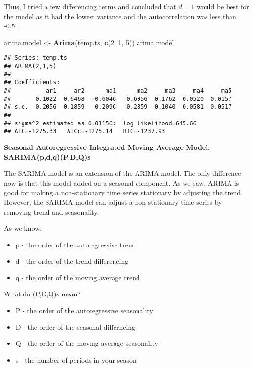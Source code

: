 \documentclass[
]{book}
\newenvironment{Shaded}{\begin{snugshade}}{\end{snugshade}}
\newcommand{\DecValTok}[1]{\textcolor[rgb]{0.00,0.00,0.81}{#1}}
\newcommand{\KeywordTok}[1]{\textcolor[rgb]{0.13,0.29,0.53}{\textbf{#1}}}
\newcommand{\NormalTok}[1]{#1}
\newcommand{\StringTok}[1]{\textcolor[rgb]{0.31,0.60,0.02}{#1}}
\providecommand{\tightlist}{%
  \setlength{\itemsep}{0pt}\setlength{\parskip}{0pt}}
\begin{document}
Thus, I tried a few differencing terms and concluded that \(d=1\) would be best for the model as it had the lowest variance and the autocorrelation was less than -0.5.

\begin{Shaded}
\begin{Highlighting}[]
\NormalTok{arima.model <-}\StringTok{ }\KeywordTok{Arima}\NormalTok{(temp.ts, }\KeywordTok{c}\NormalTok{(}\DecValTok{2}\NormalTok{, }\DecValTok{1}\NormalTok{, }\DecValTok{5}\NormalTok{))}
\NormalTok{arima.model}
\end{Highlighting}
\end{Shaded}

\begin{verbatim}
## Series: temp.ts 
## ARIMA(2,1,5) 
## 
## Coefficients:
##          ar1     ar2      ma1      ma2     ma3     ma4     ma5
##       0.1022  0.6468  -0.6046  -0.6056  0.1762  0.0520  0.0157
## s.e.  0.2056  0.1859   0.2096   0.2859  0.1040  0.0581  0.0517
## 
## sigma^2 estimated as 0.01156:  log likelihood=645.66
## AIC=-1275.33   AICc=-1275.14   BIC=-1237.93
\end{verbatim}

\textbf{Seasonal Autoregressive Integrated Moving Average Model: SARIMA(p,d,q)(P,D,Q)s}

The SARIMA model is an extension of the ARIMA model. The only difference now is that this model added on a seasonal component. As we saw, ARIMA is good for making a non-stationary time series stationary by adjusting the trend. However, the SARIMA model can adjust a non-stationary time series by removing trend and seasonality.

As we know:

\begin{itemize}
\tightlist
\item
  p - the order of the autoregressive trend
\item
  d - the order of the trend differencing
\item
  q - the order of the moving average trend
\end{itemize}

What do (P,D,Q)s mean?

\begin{itemize}
\tightlist
\item
  P - the order of the autoregressive seasonality
\item
  D - the order of the seasonal differncing
\item
  Q - the order of the moving average seasonality
\item
  s - the number of periods in your season
\end{itemize}
\end{document}
